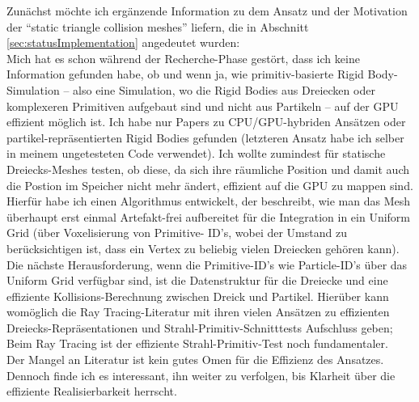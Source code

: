 



	Zunächst möchte ich ergänzende Information zu dem Ansatz und der Motivation der
	"`static triangle collision meshes"' liefern, die in Abschnitt \ref{sec:statusImplementation} 
	angedeutet wurden:\\
  	Mich hat es schon während der Recherche-Phase gestört, dass ich keine Information gefunden habe, ob und wenn ja, 
  	wie primitiv-basierte Rigid Body-Simulation -- also eine Simulation, wo die Rigid Bodies 
  	aus Dreiecken oder komplexeren Primitiven aufgebaut sind und nicht aus Partikeln --
  	auf der GPU effizient möglich ist. Ich habe nur Papers
  	zu CPU/GPU-hybriden Ansätzen oder partikel-repräsentierten Rigid Bodies gefunden (letzteren Ansatz
  	habe ich selber in meinem ungetesteten Code verwendet). 
  	Ich wollte zumindest für statische Dreiecks-Meshes testen, ob diese,
  	da sich ihre räumliche Position und damit auch die Postion im Speicher nicht mehr ändert,
  	effizient auf die GPU zu mappen sind. Hierfür habe ich einen Algorithmus entwickelt, der beschreibt,
  	wie man das Mesh überhaupt erst einmal Artefakt-frei aufbereitet für die Integration in ein Uniform Grid 
  	(über Voxelisierung von	Primitive- ID's, wobei der Umstand zu berücksichtigen ist, 
  	dass ein Vertex zu beliebig vielen Dreiecken gehören kann).
  	Die nächste Herausforderung, wenn die Primitive-ID's wie Particle-ID's über das Uniform Grid verfügbar sind,
  	ist die Datenstruktur für die Dreiecke und eine effiziente Kollisions-Berechnung zwischen Dreick und Partikel.
  	Hierüber kann womöglich die Ray Tracing-Literatur mit ihren vielen Ansätzen zu effizienten
  	Dreiecks-Repräsentationen und Strahl-Primitiv-Schnitttests Aufschluss geben; Beim Ray Tracing ist der effiziente 
  	Strahl-Primitiv-Test noch fundamentaler.\\
  	Der Mangel an Literatur ist kein gutes Omen für die Effizienz des Ansatzes. Dennoch finde ich es
  	interessant, ihn weiter zu verfolgen, bis Klarheit über die effiziente Realisierbarkeit herrscht.\\
  	
  	
  	
